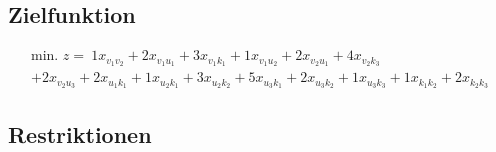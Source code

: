 \documentclass[a4paper,11pt]{article}
\begin{document}
\subsection*{Zielfunktion}
\begin{multline*}
  \text{min. } z =~ 
      1x_{v_1 v_2}
    + 2x_{v_1 u_1}
    + 3x_{v_1 k_1}
    + 1x_{v_1 u_2}
    + 2x_{v_2 u_1}
    + 4x_{v_2 k_3} \\
    + 2x_{v_2 u_3}
    + 2x_{u_1 k_1}
    + 1x_{u_2 k_1}
    + 3x_{u_2 k_2}
    + 5x_{u_3 k_1}
    + 2x_{u_3 k_2}
    + 1x_{u_3 k_3}
    + 1x_{k_1 k_2}
    + 2x_{k_2 k_3}
\end{multline*}

\subsection*{Restriktionen}
\end{document}
